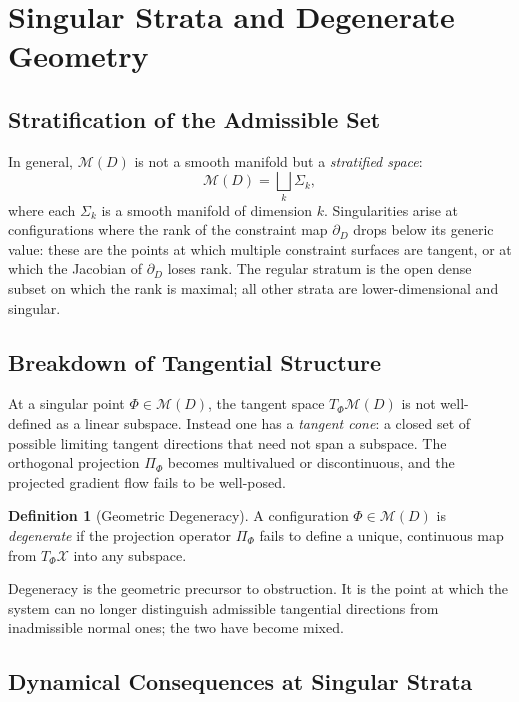 \documentclass[12pt,oneside]{article}
\theoremstyle{plain}
\theoremstyle{definition}
\newtheorem{definition}[theorem]{Definition}
\theoremstyle{remark}
\newcommand{\X}{\mathcal{X}}
\newcommand{\M}{\mathcal{M}}
\newcommand{\D}{D}
\newcommand{\Sig}{\Sigma}
\begin{document}
\section{Singular Strata and Degenerate Geometry}
\label{sec:singular}

\subsection{Stratification of the Admissible Set}

In general, $\M(\D)$ is not a smooth manifold but a \emph{stratified space}:
\[
  \M(\D) = \bigsqcup_k \Sig_k,
\]
where each $\Sig_k$ is a smooth manifold of dimension $k$. Singularities arise
at configurations where the rank of the constraint map $\partial_\D$ drops below
its generic value: these are the points at which multiple constraint surfaces
are tangent, or at which the Jacobian of $\partial_\D$ loses rank. The regular
stratum is the open dense subset on which the rank is maximal; all other strata
are lower-dimensional and singular.

\subsection{Breakdown of Tangential Structure}

At a singular point $\Phi \in \M(\D)$, the tangent space $T_\Phi\M(\D)$ is not
well-defined as a linear subspace. Instead one has a \emph{tangent cone}: a
closed set of possible limiting tangent directions that need not span a
subspace. The orthogonal projection $\Pi_\Phi$ becomes multivalued or
discontinuous, and the projected gradient flow fails to be well-posed.

\begin{definition}[Geometric Degeneracy]
A configuration $\Phi \in \M(\D)$ is \emph{degenerate} if the projection
operator $\Pi_\Phi$ fails to define a unique, continuous map from $T_\Phi\X$
into any subspace.
\end{definition}

Degeneracy is the geometric precursor to obstruction. It is the point at which
the system can no longer distinguish admissible tangential directions from
inadmissible normal ones; the two have become mixed.

\subsection{Dynamical Consequences at Singular Strata}
\end{document}
